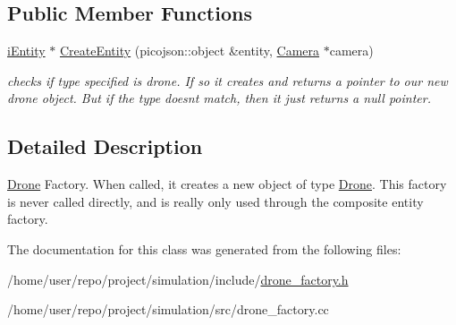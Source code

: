 \subsection*{Public Member Functions}
\begin{DoxyCompactItemize}
\item 
\mbox{\label{classDroneFactory_a9debaee3f504bd6506d7ddb9ebba0baf}} 
\hyperlink{classiEntity}{i\+Entity} $\ast$ \hyperlink{classDroneFactory_a9debaee3f504bd6506d7ddb9ebba0baf}{Create\+Entity} (picojson\+::object \&entity, \hyperlink{classCamera}{Camera} $\ast$camera)
\begin{DoxyCompactList}\small\item\em checks if type specified is drone. If so it creates and returns a pointer to our new drone object. But if the type doesn\textquotesingle{}t match, then it just returns a null pointer. \end{DoxyCompactList}\end{DoxyCompactItemize}


\subsection{Detailed Description}
\hyperlink{classDrone}{Drone} Factory. When called, it creates a new object of type \hyperlink{classDrone}{Drone}. This factory is never called directly, and is really only used through the composite entity factory. 

The documentation for this class was generated from the following files\+:\begin{DoxyCompactItemize}
\item 
/home/user/repo/project/simulation/include/\hyperlink{drone__factory_8h}{drone\+\_\+factory.\+h}\item 
/home/user/repo/project/simulation/src/drone\+\_\+factory.\+cc\end{DoxyCompactItemize}
